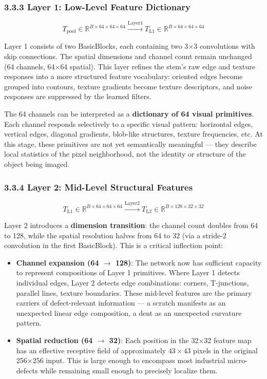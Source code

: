 \documentclass[12pt, a4paper, oneside]{report}
\begin{document}
\subsubsection{3.3.3 Layer 1: Low-Level Feature Dictionary}\label{layer-1-low-level-feature-dictionary}

\[T_{\text{pool}} \in \mathbb{R}^{B \times 64 \times 64 \times 64} \xrightarrow{\text{Layer1}} T_{\text{L1}} \in \mathbb{R}^{B \times 64 \times 64 \times 64}\]

Layer 1 consists of two BasicBlocks, each containing two 3$\times$3 convolutions with skip connections. The spatial dimensions and channel count remain unchanged (64 channels, 64$\times$64 spatial). This layer refines the stem's raw edge and texture responses into a more structured feature vocabulary: oriented edges become grouped into contours, texture gradients become texture descriptors, and noise responses are suppressed by the learned filters.

The 64 channels can be interpreted as a \textbf{dictionary of 64 visual primitives}. Each channel responds selectively to a specific visual pattern: horizontal edges, vertical edges, diagonal gradients, blob-like structures, texture frequencies, etc. At this stage, these primitives are not yet semantically meaningful --- they describe local statistics of the pixel neighborhood, not the identity or structure of the object being imaged.

\subsubsection{3.3.4 Layer 2: Mid-Level Structural Features}\label{layer-2-mid-level-structural-features}

\[T_{\text{L1}} \in \mathbb{R}^{B \times 64 \times 64 \times 64} \xrightarrow{\text{Layer2}} T_{\text{L2}} \in \mathbb{R}^{B \times 128 \times 32 \times 32}\]

Layer 2 introduces a \textbf{dimension transition}: the channel count doubles from 64 to 128, while the spatial resolution halves from 64 to 32 (via a stride-2 convolution in the first BasicBlock). This is a critical inflection point:

\begin{itemize}
\item
  \textbf{Channel expansion (64 $\rightarrow$ 128)}: The network now has sufficient capacity to represent compositions of Layer 1 primitives. Where Layer 1 detects individual edges, Layer 2 detects edge combinations: corners, T-junctions, parallel lines, texture boundaries. These mid-level features are the primary carriers of defect-relevant information --- a scratch manifests as an unexpected linear edge composition, a dent as an unexpected curvature pattern.
\item
  \textbf{Spatial reduction (64 $\rightarrow$ 32)}: Each position in the 32$\times$32 feature map has an effective receptive field of approximately \(43 \times 43\) pixels in the original 256$\times$256 input. This is large enough to encompass most industrial micro-defects while remaining small enough to precisely localize them.
\end{itemize}
\end{document}
